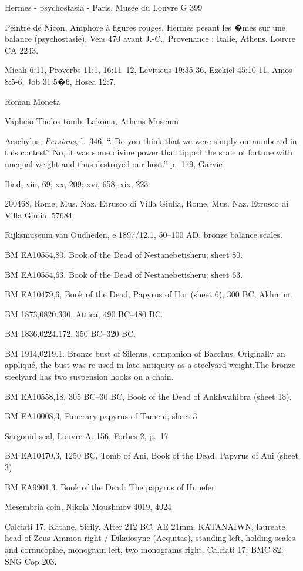 \documentclass{article}
\begin{document}
Hermes - psychostasia - Paris. Mus\'ee du Louvre G 399 

Peintre de Nicon, Amphore \`a figures rouges,
Herm\`es pesant les �mes sur une balance (psychostasie),
Vers 470 avant J.-C.,
Provenance : Italie,
Athens. Louvre CA 2243.

Micah 6:11, Proverbs 11:1, 16:11--12, Leviticus 19:35-36,
Ezekiel 45:10-11, Amos 8:5-6, Job 31:5�6,
Hosea 12:7, 


Roman Moneta

Vapheio Tholos tomb, Lakonia, Athens Museum

Aeschylus, {\em Persians},
l.~346, ``. Do you think that we were simply outnumbered in this contest? No, it was some divine power that tipped the scale of fortune with unequal weight and thus destroyed our host.''
p.~179, Garvie

Iliad, viii, 69; xx, 209; xvi, 658; xix, 223

200468, Rome, Mus. Naz. Etrusco di Villa Giulia, Rome, Mus. Naz. Etrusco di Villa Giulia, 57684

Rijksmuseum van Oudheden, e 1897/12.1, 50--100 AD, bronze balance scales.

BM EA10554,80. Book of the Dead of Nestanebetisheru; sheet 80.

BM EA10554,63. Book of the Dead of Nestanebetisheru; sheet 63.

BM EA10479,6, Book of the Dead, Papyrus of Hor (sheet 6), 300 BC, Akhmim.

BM 1873,0820.300, Attica, 490 BC--480 BC.

BM 1836,0224.172, 350 BC--320 BC.

BM 1914,0219.1. Bronze bust of Silenus, companion of Bacchus. Originally an appliqué, the bust was re-used in late antiquity as a steelyard weight.The bronze steelyard has two suspension hooks on a chain.

BM EA10558,18, 305 BC--30 BC, Book of the Dead of Ankhwahibra (sheet 18).

BM EA10008,3, Funerary papyrus of Tameni; sheet 3

Sargonid seal, Louvre A. 156, Forbes 2, p.~17

BM EA10470,3, 1250 BC, Tomb of Ani, Book of the Dead, Papyrus of Ani (sheet 3)

BM EA9901,3. Book of the Dead: The papyrus of Hunefer.

Mesembria coin, Nikola Moushmov  4019, 4024

Calciati 17. Katane, Sicily. After 212 BC. AE 21mm. KATANAIWN, laureate head of Zeus Ammon right / Dikaiosyne (Aequitas), standing left, holding scales and cornucopiae, monogram left, two monograms right. Calciati 17; BMC 82; SNG Cop 203.
\end{document}
